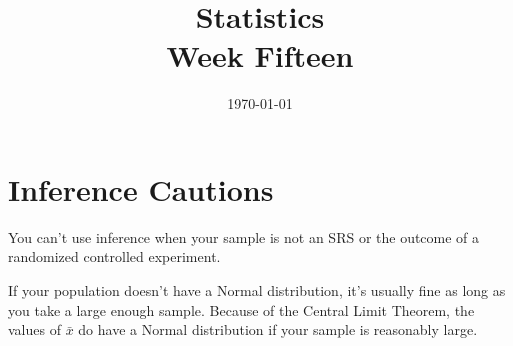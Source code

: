 \documentclass[letterpaper, landscape]{exam}
\title{Statistics \\ Week Fifteen}
\date{\today}
\author{}
\begin{document}
  \maketitle
  \tableofcontents

  \section{Inference Cautions}
  You can't use inference when your sample is not an SRS or the outcome of a
  randomized controlled experiment.

  If your population doesn't have a Normal distribution, it's usually fine as
  long as you take a large enough sample. Because of the Central Limit Theorem,
  the values of $\bar{x}$ do have a Normal distribution if your sample is
  reasonably large.







\end{document}
